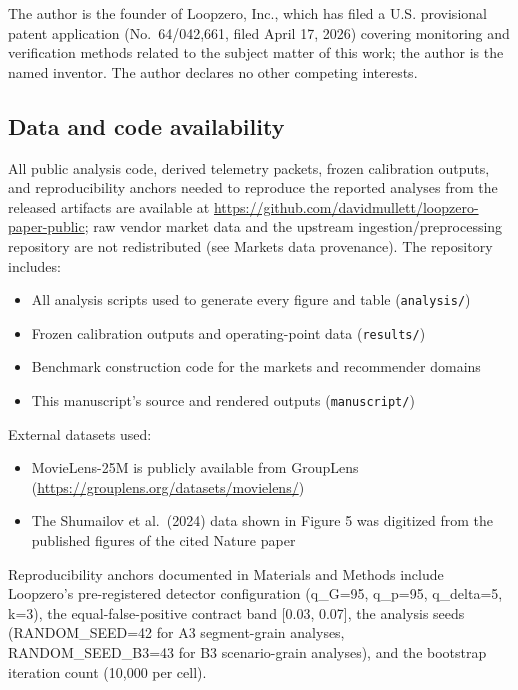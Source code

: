 \documentclass[
  11pt,
]{article}
\providecommand{\tightlist}{%
  \setlength{\itemsep}{0pt}\setlength{\parskip}{0pt}}
\begin{document}
The author is the founder of Loopzero, Inc., which has filed a U.S.
provisional patent application (No.~64/042,661, filed April 17, 2026)
covering monitoring and verification methods related to the subject
matter of this work; the author is the named inventor. The author
declares no other competing interests.

\subsection{Data and code
availability}\label{data-and-code-availability}

All public analysis code, derived telemetry packets, frozen calibration
outputs, and reproducibility anchors needed to reproduce the reported
analyses from the released artifacts are available at
\url{https://github.com/davidmullett/loopzero-paper-public}; raw vendor
market data and the upstream ingestion/preprocessing repository are not
redistributed (see Markets data provenance). The repository includes:

\begin{itemize}
\tightlist
\item
  All analysis scripts used to generate every figure and table
  (\texttt{analysis/})
\item
  Frozen calibration outputs and operating-point data
  (\texttt{results/})
\item
  Benchmark construction code for the markets and recommender domains
\item
  This manuscript's source and rendered outputs (\texttt{manuscript/})
\end{itemize}

External datasets used:

\begin{itemize}
\tightlist
\item
  MovieLens-25M is publicly available from GroupLens
  (\url{https://grouplens.org/datasets/movielens/})
\item
  The Shumailov et al.~(2024) data shown in Figure 5 was digitized from
  the published figures of the cited Nature paper
\end{itemize}

Reproducibility anchors documented in Materials and Methods include
Loopzero's pre-registered detector configuration (q\_G=95, q\_p=95,
q\_delta=5, k=3), the equal-false-positive contract band {[}0.03,
0.07{]}, the analysis seeds (RANDOM\_SEED=42 for A3 segment-grain
analyses, RANDOM\_SEED\_B3=43 for B3 scenario-grain analyses), and the
bootstrap iteration count (10,000 per cell).
\end{document}
